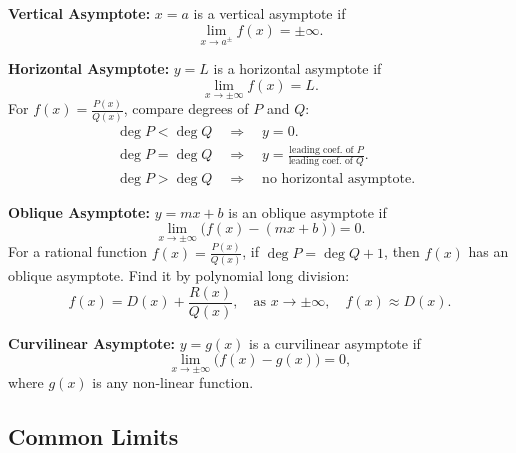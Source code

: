 \documentclass[a4paper,11pt]{article}
\begin{document}
\begin{tcolorbox}[breakable]
    \textbf{Vertical Asymptote:} 
    \( x = a \) is a vertical asymptote if  
    \[
    \lim\limits_{x \to a^{\pm}} f(x) = \pm\infty.
    \]
    
    \textbf{Horizontal Asymptote:}
    \( y = L \) is a horizontal asymptote if  
    \[
    \lim\limits_{x \to \pm\infty} f(x) = L.
    \]
    For \( \displaystyle f(x) = \frac{P(x)}{Q(x)} \), compare degrees of \( P \) and \( Q \):  
    \[
    \begin{aligned}
        &\deg P < \deg Q \quad \Rightarrow \quad y = 0. \\  
        &\deg P = \deg Q \quad \Rightarrow \quad y = \frac{\text{leading coef. of } P}{\text{leading coef. of } Q}. \\  
        &\deg P > \deg Q \quad \Rightarrow \quad \text{no horizontal asymptote}.
    \end{aligned}
    \]

    \textbf{Oblique Asymptote:}
    \( y = mx + b \) is an oblique asymptote if  
    \[
    \lim\limits_{x \to \pm\infty} \big( f(x) - (mx + b) \big) = 0.
    \]
    For a rational function \( \displaystyle f(x) = \frac{P(x)}{Q(x)} \), if \( \deg P = \deg Q + 1 \), then \( f(x) \) has an oblique asymptote.  
    Find it by polynomial long division:  
    \[
    f(x) = D(x) + \frac{R(x)}{Q(x)}, \quad \text{as } x \to \pm\infty, \quad f(x) \approx D(x).
    \]
    
    \newpage
    
    \textbf{Curvilinear Asymptote:}
    \( y = g(x) \) is a curvilinear asymptote if
    \[
    \lim\limits_{x \to \pm\infty} \big( f(x) - g(x) \big) = 0,
    \]
    where \( g(x) \) is any non-linear function.
\end{tcolorbox}




\subsection{Common Limits}
\end{document}
